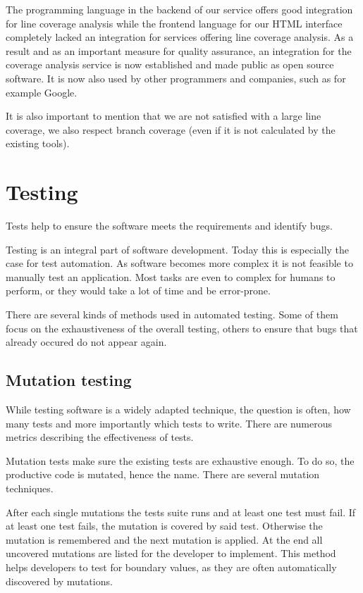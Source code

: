 The programming language in the backend of our service offers good integration
for line coverage analysis while the frontend language for our HTML interface
completely lacked an integration for services offering line coverage analysis.
As a result and as an important measure for quality assurance, an integration
for the coverage analysis service is now established and made public as open
source software. It is now also used by other programmers and companies, such
as for example Google.

It is also important to mention that we are not satisfied with a large line
coverage, we also respect branch coverage (even if it is not calculated by
the existing tools).

\section{Testing}

Tests help to ensure the software meets the requirements and identify bugs.

Testing is an integral part of software development. Today this is especially
the case for test automation. As software becomes more complex it is not
feasible to manually test an application. Most tasks are even to complex for
humans to perform, or they would take a lot of time and be error-prone.

There are several kinds of methods used in automated testing. Some of them
focus on the exhaustiveness of the overall testing, others to ensure that bugs
that already occured do not appear again.

\subsection{Mutation testing}

While testing software is a widely adapted technique, the question is often,
how many tests and more importantly which tests to write. There are numerous
metrics describing the effectiveness of tests.

Mutation tests make sure the existing tests are exhaustive enough. To do so,
the productive code is mutated, hence the name. There are several mutation
techniques.

After each single mutations the tests suite runs and at least one test must
fail. If at least one test fails, the mutation is covered by said test.
Otherwise the mutation is remembered and the next mutation is applied. At the
end all uncovered mutations are listed for the developer to implement. This
method helps developers to test for boundary values, as they are often
automatically discovered by mutations.

